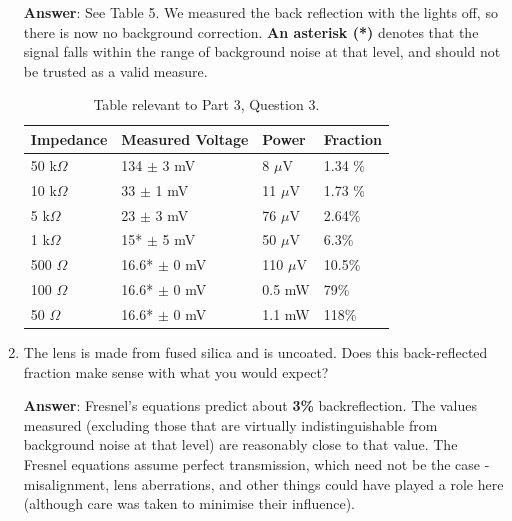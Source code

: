\documentclass[10pt,a4paper]{article}
\begin{document}
\begin{enumerate}
\textbf{Answer}: See Table 5. We measured the back reflection with the lights off, so there is now no background correction. \textbf{An asterisk (*)} denotes that the signal falls within the range of background noise at that level, and should not be trusted as a valid measure.
\begin{table}[h]
\centering
\begin{tabular}{|p{2cm}p{2cm}p{2cm}p{2cm}|}
\hline 
Impedance & Measured Voltage & Power & Fraction\footnotemark \\
\hline 
50 k$\Omega$ & 134 $\pm$ 3 mV & 8 $\mu$V & 1.34 \% \\ 
\hline 
10 k$\Omega$ & 33 $\pm$ 1 mV & 11 $\mu$V & 1.73 \% \\ 
\hline 
5 k$\Omega$ & 23 $\pm$ 3 mV & 76 $\mu$V & 2.64\% \\ 
\hline 
1 k$\Omega$ & 15* $\pm$ 5 mV & 50 $\mu$V & 6.3\% \\ 
\hline 
500 $\Omega$ & 16.6* $\pm$ 0 mV & 110 $\mu$V & 10.5\% \\ 
\hline 
100 $\Omega$ & 16.6* $\pm$ 0 mV & 0.5 mW & 79\% \\ 
\hline 
50 $\Omega$ & 16.6* $\pm$ 0 mV & 1.1 mW & 118\%\\ 
\hline 
\end{tabular}
\caption{Table relevant to Part 3, Question 3.}
\end{table}
\item The lens is made from fused silica and is uncoated. Does this back-reflected fraction make sense with what you would expect?

\textbf{Answer}: Fresnel's equations predict about \textbf{3\%} backreflection. The values measured (excluding those that are virtually indistinguishable from background noise at that level) are reasonably close to that value. The Fresnel equations assume perfect transmission, which need not be the case - misalignment, lens aberrations, and other things could have played a role here (although care was taken to minimise their influence).
\end{enumerate}
\end{document}
